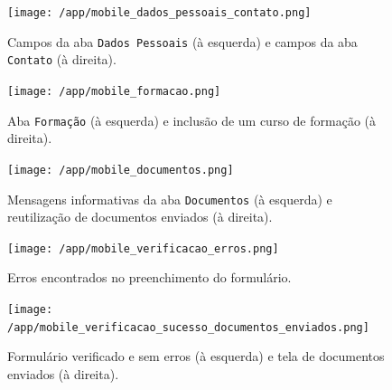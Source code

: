 \documentclass[
  10.5pt,				  %
	openright,			%
	twoside,			  %
  a5paper,
  chapter=TITLE,	%
	section=TITLE,	%
  hyphens,        %
	english,        %
	brazil          %
]{abntex2}
\begin{document}
\begin{figure}[!ht]
  \caption{\label{fig:mobile_dados_pessoais_contato} Campos da aba \texttt{Dados Pessoais} (à esquerda) e campos da aba \texttt{Contato} (à direita).}
  \begin{center}
    \texttt{[image: /app/mobile\_dados\_pessoais\_contato.png]}
  \end{center}
\end{figure}

\begin{figure}[!ht]
  \caption{\label{fig:mobile_formacao} Aba \texttt{Formação} (à esquerda) e inclusão de um curso de formação (à direita).}
  \begin{center}
    \texttt{[image: /app/mobile\_formacao.png]}
  \end{center}
\end{figure}

\begin{figure}[!ht]
  \caption{\label{fig:mobile_documentos} Mensagens informativas da aba \texttt{Documentos} (à esquerda) e reutilização de documentos enviados (à direita).}
  \begin{center}
    \texttt{[image: /app/mobile\_documentos.png]}
  \end{center}
\end{figure}


\begin{figure}[!ht]
  \caption{\label{fig:mobile_verificacao_erros} Erros encontrados no preenchimento do formulário.}
  \begin{center}
    \texttt{[image: /app/mobile\_verificacao\_erros.png]}
  \end{center}
\end{figure}

\begin{figure}[!ht]
  \caption{\label{fig:mobile_verificacao_sucesso_documentos_enviados} Formulário verificado e sem erros (à esquerda) e tela de documentos enviados (à direita).}
  \begin{center}
    \texttt{[image: /app/mobile\_verificacao\_sucesso\_documentos\_enviados.png]}
  \end{center}
\end{figure}
\end{document}
